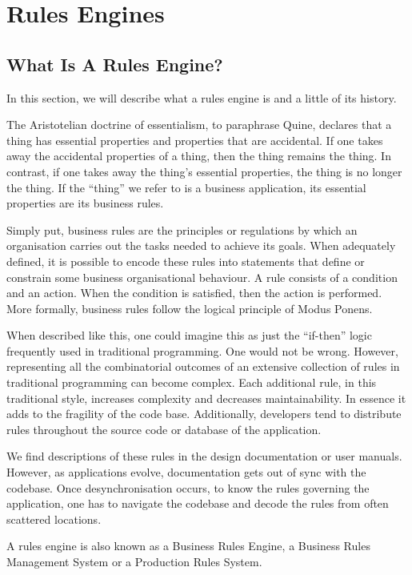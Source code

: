 \section{Rules Engines}

\subsection{What Is A Rules Engine?}
\label{section:what_is_a_rules_engine}

In this section, we will describe what a rules engine is and a little of its history.

The Aristotelian doctrine of essentialism, to paraphrase Quine\cite{quine1953three}, declares that a thing has essential properties and properties that are accidental.
If one takes away the accidental properties of a thing, then the thing remains the thing.
In contrast, if one takes away the thing's essential properties, the thing is no longer the thing.
If the ``thing'' we refer to is a business application, its essential properties are its business rules.

Simply put, business rules are the principles or regulations by which an organisation carries out the tasks needed to achieve its goals.
When adequately defined, it is possible to encode these rules into statements that define or constrain some business organisational behaviour.
A rule consists of a condition and an action.
When the condition is satisfied, then the action is performed.
More formally, business rules follow the logical principle of Modus Ponens.

When described like this, one could imagine this as just the ``if-then'' logic frequently used in traditional programming.
One would not be wrong. 
However, representing all the combinatorial outcomes of an extensive collection of rules in traditional programming can become complex.
Each additional rule, in this traditional style, increases complexity and decreases maintainability.
In essence it adds to the fragility of the code base.
Additionally, developers tend to distribute rules throughout the source code or database of the application.

We find descriptions of these rules in the design documentation or user manuals.
However, as applications evolve, documentation gets out of sync with the codebase.
Once desynchronisation occurs, to know the rules governing the application, one has to navigate the codebase and decode the rules from often scattered locations.

A rules engine is also known as a Business Rules Engine, a Business Rules Management System or a Production Rules System.

